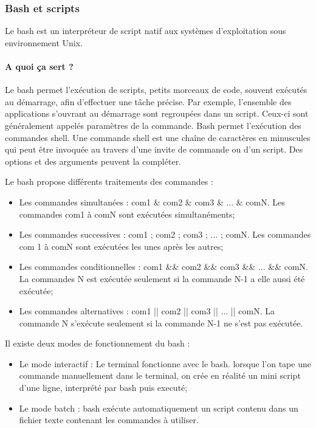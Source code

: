 \subsubsection{Bash et scripts}

Le bash est un interpréteur de script natif aux systèmes d'exploitation sous environnement Unix.


\paragraph{A quoi ça sert ?}

Le bash permet l'exécution de scripts, petits morceaux de code, souvent exécutés au démarrage, afin d'effectuer une tâche précise.
Par exemple, l'ensemble des applications s'ouvrant au démarrage sont regroupées dans un script. Ceux-ci sont généralement appelés
paramètres de la commande. Bash permet l'exécution des commandes shell. Une commande shell est une chaîne de caractères en minuscules
qui peut être invoquée au travers d'une invite de commande ou d'un script. Des options et des arguments peuvent la compléter.

Le bash propose différents traitements des commandes :
\begin{itemize}
  \item Les commandes simultanées : com1 \& com2 \& com3 \& ... \& comN. Les commandes com1 à comN sont exécutées simultanéments;
  \item Les commandes successives : com1 ; com2 ; com3 ; ... ; comN. Les commandes com 1 à comN sont exécutées les unes après les autres;
  \item Les commandes conditionnelles : com1 \&\& com2 \&\& com3 \&\& ... \&\& comN. La commandes N est exécutée seulement si la commande N-1 a elle aussi été exécutée;
  \item Les commandes alternatives : com1 || com2 || com3 || ... || comN. La commande N s'exécute seulement si la commande N-1 ne s'est pas exécutée.
\end{itemize}

Il existe deux modes de fonctionnement du bash :
\begin{itemize}
  \item Le mode interactif : Le terminal fonctionne avec le bash. lorsque l'on tape une commande manuellement dans le terminal,
  on crée en réalité un mini script d'une ligne, interprété par bash puis executé;
  \item Le mode batch : bash exécute automatiquement un script contenu dans un fichier texte contenant les commandes à utiliser.
\end{itemize}


